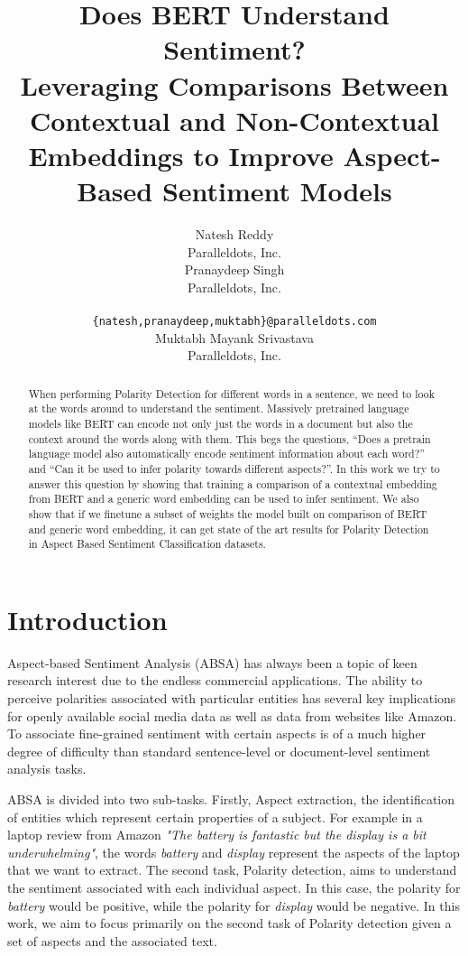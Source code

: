\documentclass[11pt,a4paper]{article}
\title{Does BERT Understand Sentiment? \\ Leveraging Comparisons Between Contextual and Non-Contextual Embeddings to Improve Aspect-Based Sentiment Models}
\author{Natesh Reddy \\
  Paralleldots, Inc. \\\And
Pranaydeep Singh \\
  Paralleldots, Inc. \\
  \\
  \texttt{\{natesh,pranaydeep,muktabh\}@paralleldots.com} \\\And
  Muktabh Mayank Srivastava \\
  Paralleldots, Inc. \\
}
\date{}
\begin{document}
\maketitle
\begin{abstract}
When performing Polarity Detection for different words in a sentence, we need to look at the words around to understand the sentiment. Massively pretrained language models like BERT can encode not only just the words in a document but also the context around the words along with them. This begs the questions, “Does a pretrain language model also automatically encode sentiment information about each word?” and “Can it be used to infer polarity towards different aspects?”. In this work we try to answer this question by showing that training a comparison of a contextual embedding from BERT and a generic word embedding can be used to infer sentiment. We also show that if we finetune a subset of weights the model built on comparison of BERT and generic word embedding, it can get state of the art results for Polarity Detection in Aspect Based Sentiment Classification datasets.
\end{abstract}


\section{Introduction}

Aspect-based Sentiment Analysis (ABSA) has always been a topic of keen research interest due to the endless commercial applications. The ability to perceive polarities associated with particular entities has several key implications for openly available social media data as well as data from websites like Amazon. To associate fine-grained sentiment with certain aspects is of a much higher degree of difficulty than standard sentence-level or document-level sentiment analysis tasks.

ABSA is divided into two sub-tasks. Firstly, Aspect extraction, the identification of entities which represent certain properties of a subject. For example in a laptop review from Amazon \textit{"The battery is fantastic but the display is a bit underwhelming"}, the words \textit{battery} and \textit{display} represent the aspects of the laptop that we want to extract. The second task, Polarity detection, aims to understand the sentiment associated with each individual aspect. In this case, the polarity for \textit{battery} would be positive, while the polarity for \textit{display} would be negative. In this work, we aim to focus primarily on the second task of Polarity detection given a set of aspects and the associated text.
\end{document}
